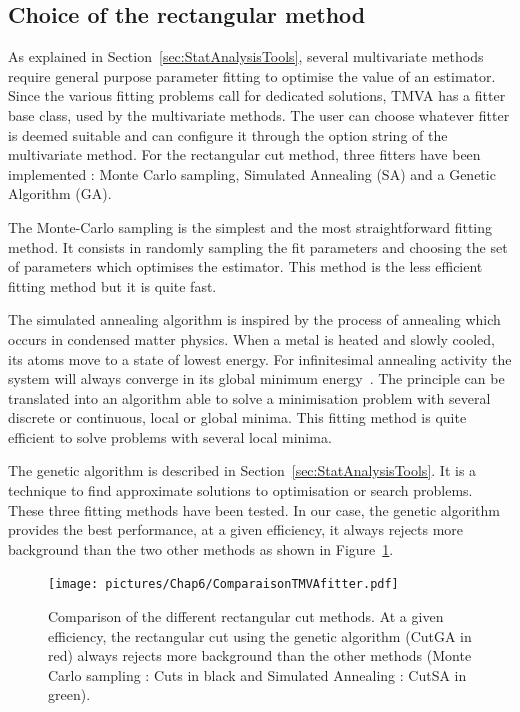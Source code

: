 \documentclass[main.tex]{subfiles}
\begin{document}
\FloatBarrier


\subsection{Choice of the rectangular method}\label{sec:ChoiceRCmethod}


\NI As explained in Section~\ref{sec:StatAnalysisTools}, several multivariate methods require general purpose parameter fitting to optimise the value of an estimator. Since the various fitting problems call for dedicated solutions, TMVA has a fitter base class, used by the multivariate methods. The user can choose whatever fitter is deemed suitable and can configure it through the option string of the multivariate method. For the rectangular cut method, three fitters have been implemented : Monte Carlo sampling, Simulated Annealing (SA) and a Genetic Algorithm (GA).


\bigskip


\NI The Monte-Carlo sampling is the simplest and the most straightforward fitting method. It consists in randomly sampling the fit parameters and choosing the set of parameters which optimises the estimator. This method is the less efficient fitting method but it is quite fast.


\bigskip


\NI The simulated annealing algorithm is inspired by the process of annealing which occurs in condensed matter physics. When a metal is heated and slowly cooled, its atoms move to a state of lowest energy. For  infinitesimal  annealing  activity  the system  will  always converge in its global minimum energy~\cite{SimulatedAnnealing}. The principle can be translated into an algorithm able to solve a minimisation problem with several discrete or continuous, local or global minima. This fitting method is quite efficient to solve problems with several local minima.


\bigskip


\NI The genetic algorithm is described in Section~\ref{sec:StatAnalysisTools}. It is a technique to find approximate solutions to optimisation or search problems. These three fitting methods have been tested. In our case, the genetic algorithm provides the best performance, at a given efficiency, it always rejects more background than the two other methods as shown in Figure~\ref{comparisonRC}. 


\begin{figure} [h!]
\begin{center}
\texttt{[image: pictures/Chap6/ComparaisonTMVAfitter.pdf]}
\end{center}
\caption{Comparison of the different rectangular cut methods. At a given efficiency, the rectangular cut using the genetic algorithm (CutGA in red) always rejects more background than the other methods (Monte Carlo sampling : Cuts in black and Simulated Annealing : CutSA in green).}
\label{comparisonRC}
\end{figure}
\end{document}
